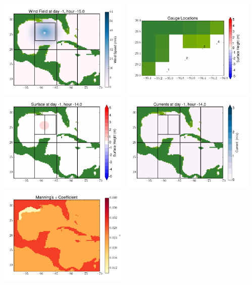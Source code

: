 \documentclass[11pt]{article}
\begin{document}
\vskip 10pt 
\includegraphics[width=0.475\textwidth]{frame0033fig9.png}
\includegraphics[width=0.475\textwidth]{frame0033fig10.png}
\vskip 10pt 
\includegraphics[width=0.475\textwidth]{frame0034fig1.png}
\includegraphics[width=0.475\textwidth]{frame0034fig2.png}
\vskip 10pt 
\includegraphics[width=0.475\textwidth]{frame0034fig3.png}
\end{document}
